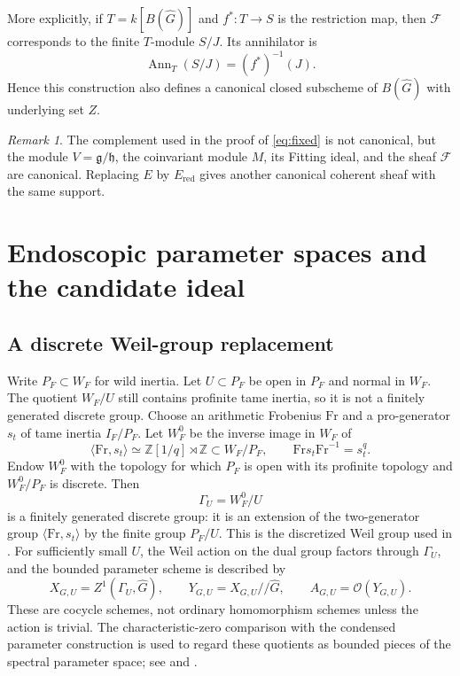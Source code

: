 \documentclass[11pt,a4paper]{amsart}
\newcommand{\OO}{\mathcal O}
\theoremstyle{definition}
\theoremstyle{remark}
\newtheorem{remark}[theorem]{Remark}
\begin{document}
More explicitly, if $T=k[B( \hat G)]$ and $f^*:T\to S$ is the restriction map,
then $\mathcal F$ corresponds to the finite $T$-module $S/J$. Its annihilator
is
$$
 \operatorname{Ann}_T(S/J)=(f^*)^{-1}(J).
$$
Hence this construction also defines a canonical closed subscheme of
$B( \hat G)$ with underlying set $Z$.

\begin{remark}
The complement used in the proof of \eqref{eq:fixed} is not canonical,
but the module $V=\mathfrak g/\mathfrak h$, the coinvariant module $M$,
its Fitting ideal, and the sheaf $\mathcal F$ are canonical.
Replacing $E$ by $E_{\mathrm{red}}$ gives another canonical coherent sheaf
with the same support.
\end{remark}


\section{Endoscopic parameter spaces and the candidate ideal}\label{sec:endoscopy}
\subsection{A discrete Weil-group replacement}
Write $P_F\subset W_F$ for wild inertia. Let $U\subset P_F$ be open in $P_F$ and normal in $W_F$. The quotient $W_F/U$ still contains profinite tame inertia, so it is not a finitely generated discrete group.
Choose an arithmetic Frobenius $\mathrm{Fr}$ and a pro-generator $s_t$ of tame inertia $I_F/P_F$. Let $W_F^0$ be the inverse image in $W_F$ of
$$
\langle\mathrm{Fr},s_t\rangle
\simeq\mathbb Z[1/q]\rtimes\mathbb Z\subset W_F/P_F,
\qquad \mathrm{Fr}s_t\mathrm{Fr}^{-1}=s_t^q.
$$
Endow $W_F^0$ with the topology for which $P_F$ is open with its profinite topology and $W_F^0/P_F$ is discrete. Then
$$
\Gamma_U=W_F^0/U
$$
is a finitely generated discrete group: it is an extension of the two-generator group $\langle\mathrm{Fr},s_t\rangle$ by the finite group $P_F/U$.
This is the discretized Weil group used in \cite[Introduction and Sections 2--4]{DHKM}. For sufficiently small $U$, the Weil action on the dual group factors through $\Gamma_U$, and the bounded parameter scheme is described by
$$
X_{G,U}=Z^1(\Gamma_U,\widehat G),\qquad
Y_{G,U}=X_{G,U}//\widehat G,\qquad
A_{G,U}=\OO(Y_{G,U}).
$$
These are cocycle schemes, not ordinary homomorphism schemes unless the action is trivial. The characteristic-zero comparison with the condensed parameter construction is used to regard these quotients as bounded pieces of the spectral parameter space; see \cite[Section VIII.1]{FS} and \cite{DHKM}.
\end{document}
